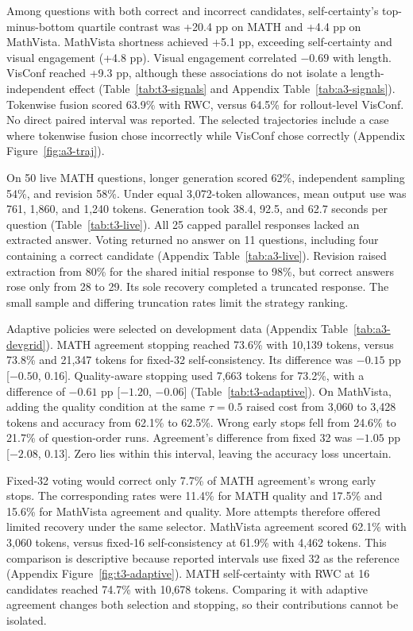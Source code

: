 \documentclass{article}
\begin{document}
Among questions with both correct and incorrect candidates, self-certainty's top-minus-bottom quartile contrast was +20.4 pp on MATH and +4.4 pp on MathVista. MathVista shortness achieved +5.1 pp, exceeding self-certainty and visual engagement (+4.8 pp). Visual engagement correlated $-0.69$ with length. VisConf reached +9.3 pp, although these associations do not isolate a length-independent effect (Table~\ref{tab:t3-signals} and Appendix Table~\ref{tab:a3-signals}). Tokenwise fusion scored 63.9\% with RWC, versus 64.5\% for rollout-level VisConf. No direct paired interval was reported. The selected trajectories include a case where tokenwise fusion chose incorrectly while VisConf chose correctly (Appendix Figure~\ref{fig:a3-traj}).

On 50 live MATH questions, longer generation scored 62\%, independent sampling 54\%, and revision 58\%. Under equal 3,072-token allowances, mean output use was 761, 1,860, and 1,240 tokens. Generation took 38.4, 92.5, and 62.7 seconds per question (Table~\ref{tab:t3-live}). All 25 capped parallel responses lacked an extracted answer. Voting returned no answer on 11 questions, including four containing a correct candidate (Appendix Table~\ref{tab:a3-live}). Revision raised extraction from 80\% for the shared initial response to 98\%, but correct answers rose only from 28 to 29. Its sole recovery completed a truncated response. The small sample and differing truncation rates limit the strategy ranking.

Adaptive policies were selected on development data (Appendix Table~\ref{tab:a3-devgrid}). MATH agreement stopping reached 73.6\% with 10,139 tokens, versus 73.8\% and 21,347 tokens for fixed-32 self-consistency. Its difference was $-0.15$ pp [$-0.50$, 0.16]. Quality-aware stopping used 7,663 tokens for 73.2\%, with a difference of $-0.61$ pp [$-1.20$, $-0.06$] (Table~\ref{tab:t3-adaptive}). On MathVista, adding the quality condition at the same \(\tau=0.5\) raised cost from 3,060 to 3,428 tokens and accuracy from 62.1\% to 62.5\%. Wrong early stops fell from 24.6\% to 21.7\% of question-order runs. Agreement's difference from fixed 32 was $-1.05$ pp [$-2.08$, 0.13]. Zero lies within this interval, leaving the accuracy loss uncertain.

Fixed-32 voting would correct only 7.7\% of MATH agreement's wrong early stops. The corresponding rates were 11.4\% for MATH quality and 17.5\% and 15.6\% for MathVista agreement and quality. More attempts therefore offered limited recovery under the same selector. MathVista agreement scored 62.1\% with 3,060 tokens, versus fixed-16 self-consistency at 61.9\% with 4,462 tokens. This comparison is descriptive because reported intervals use fixed 32 as the reference (Appendix Figure~\ref{fig:t3-adaptive}). MATH self-certainty with RWC at 16 candidates reached 74.7\% with 10,678 tokens. Comparing it with adaptive agreement changes both selection and stopping, so their contributions cannot be isolated.
\end{document}
